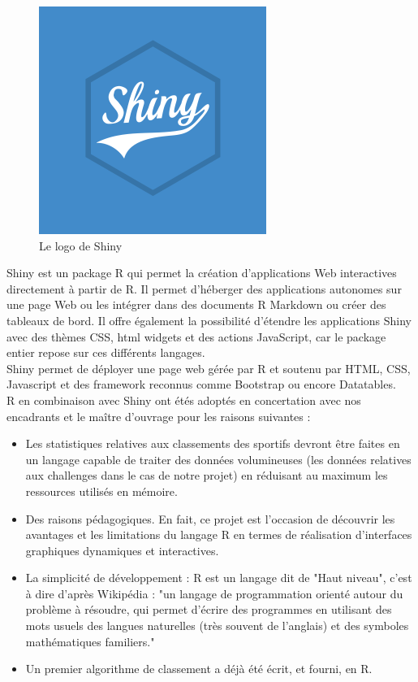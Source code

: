 \begin{figure}
	\center
	\includegraphics[scale=0.3]{img/Shiny_logo.png}
	\caption {Le logo de Shiny}
\end{figure}
Shiny est un package R qui permet la création d'applications Web interactives directement à partir de R. Il permet d’héberger des applications autonomes sur une page Web ou les intégrer dans des documents R Markdown ou créer des tableaux de bord. Il offre également la possibilité d’étendre les applications Shiny avec des thèmes CSS, html widgets et des actions JavaScript, car le package entier repose sur ces différents langages. \\

Shiny permet de déployer une page web gérée par R et soutenu par HTML, CSS, Javascript et des framework reconnus comme Bootstrap ou encore Datatables.\\


R en combinaison avec Shiny ont étés adoptés en concertation avec nos encadrants et le maître d’ouvrage pour les raisons suivantes :
\begin{itemize} 
\item Les statistiques relatives aux classements des sportifs  devront être  faites en un langage capable de traiter des données volumineuses (les données relatives aux challenges dans le cas de notre projet) en réduisant au maximum les ressources utilisés en mémoire.
\item Des raisons pédagogiques. En fait, ce projet est l’occasion de découvrir les avantages et les limitations du langage R en termes de réalisation d’interfaces graphiques dynamiques et interactives.
\item La simplicité de développement : R est un langage dit de "Haut niveau", c'est à dire d'après Wikipédia : "un langage de programmation orienté autour du problème à résoudre, qui permet d'écrire des programmes en utilisant des mots usuels des langues naturelles (très souvent de l'anglais) et des symboles mathématiques familiers."
\item Un premier algorithme de classement a déjà été écrit, et fourni, en R.
\end{itemize}

